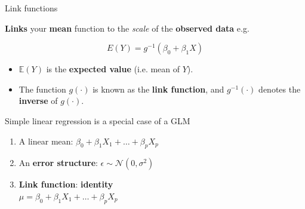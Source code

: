 \documentclass[pdf,handout]{beamer}
\begin{document}
\begin{frame}{Link functions}

\textbf{Links} your \textbf{mean} function to the \textit{scale} of the \textbf{observed data} e.g.

$$
E(Y) = g^{-1}\left(\beta_0 + \beta_1 X\right)
$$

\vfill

\begin{itemize}\addtolength{\itemsep}{2\baselineskip}
    \item $\mathbb{E}(Y)$ is the \textbf{expected value} (i.e. mean of $Y$).
    \item The function $g(\cdot)$ is known as the \textbf{link function}, and $g^{-1}(\cdot)$ denotes the \textbf{inverse} of $g(\cdot)$.
\end{itemize}

\end{frame}

\begin{frame}{Simple linear regression is a special case of a GLM}

\begin{enumerate}\addtolength{\itemsep}{2\baselineskip}
    \item<1-> A linear mean: $\beta_0 + \beta_1X_1 + \ldots + \beta_pX_p$
    \item<2-> An \textbf{error structure}: $\epsilon \sim \mathcal{N}(0,\sigma^2)$
    \item<3-> \textbf{Link function}: \textbf{identity}\\
    $\mu = \beta_0 + \beta_1X_1 + \ldots + \beta_pX_p$
\end{enumerate}

\vfill 


\end{frame}
\end{document}
